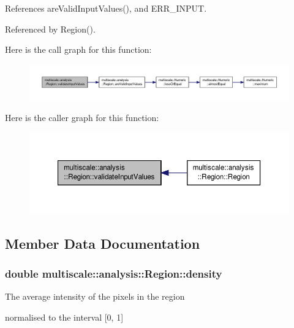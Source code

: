 References are\-Valid\-Input\-Values(), and E\-R\-R\-\_\-\-I\-N\-P\-U\-T.



Referenced by Region().



Here is the call graph for this function\-:
\nopagebreak
\begin{figure}[H]
\begin{center}
\leavevmode
\includegraphics[width=350pt]{classmultiscale_1_1analysis_1_1Region_a517b46fd89696f44086aafb1a9526995_cgraph}
\end{center}
\end{figure}




Here is the caller graph for this function\-:
\nopagebreak
\begin{figure}[H]
\begin{center}
\leavevmode
\includegraphics[width=350pt]{classmultiscale_1_1analysis_1_1Region_a517b46fd89696f44086aafb1a9526995_icgraph}
\end{center}
\end{figure}




\subsection{Member Data Documentation}
\hypertarget{classmultiscale_1_1analysis_1_1Region_af4eb62fddbe850271dfe15bb240b13bb}{
\subsubsection[{density}]{\setlength{\rightskip}{0pt plus 5cm}double multiscale\-::analysis\-::\-Region\-::density\hspace{0.3cm}{\ttfamily [private]}}}\label{classmultiscale_1_1analysis_1_1Region_af4eb62fddbe850271dfe15bb240b13bb}
\begin{DoxyVerb}             The average intensity of the pixels in the region
\end{DoxyVerb}
 normalised to the interval \mbox{[}0, 1\mbox{]} 

